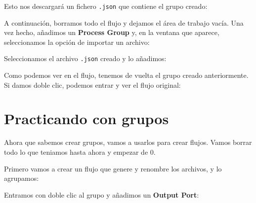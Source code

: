 \documentclass{../../miPlantilla}
\begin{document}

Esto nos descargará un fichero \texttt{.json} que contiene el grupo creado:


A continuación, borramos todo el flujo y dejamos el área de trabajo vacía. Una vez hecho, añadimos un \textbf{Process Group} y, en la ventana que aparece, seleccionamos la opción de importar un archivo:

\begin{figure}[H]
    \centering
    \begin{minipage}{0.1\textwidth}
    \end{minipage}\hfill
    \begin{minipage}{0.8\textwidth}
    \end{minipage}
\end{figure}

Seleccionamos el archivo \texttt{.json} creado y lo añadimos:


Como podemos ver en el flujo, tenemos de vuelta el grupo creado anteriormente. Si damos doble clic, podemos entrar y ver el flujo original:


\newpage

\section{Practicando con grupos}
Ahora que sabemos crear grupos, vamos a usarlos para crear flujos. Vamos borrar todo lo que teniamos hasta ahora y empezar de 0.

Primero vamos a crear un flujo que genere y renombre los archivos, y lo agrupamos:


Entramos con doble clic al grupo y añadimos un \textbf{Output Port}:

\begin{figure}[H]
    \centering
    \begin{minipage}{0.1\textwidth}
    \end{minipage}\hfill
    \begin{minipage}{0.8\textwidth}
    \end{minipage}
\end{figure}
\end{document}
